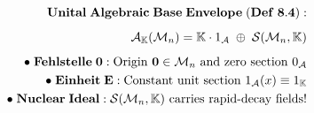\documentclass[preview]{standalone}
\begin{document}
\begin{align*}
\special{dvisvgm:raw <g id='unique000'>}\mathbf{Unital\;Algebraic\;Base\;Envelope\;(Def\;8.4):}\\[5pt]\mathcal{A}_{\mathbb{K}}(\mathcal{M}_n) = \mathbb{K}\cdot 1_{\mathcal{A}} \;\oplus\; \mathcal{S}(\mathcal{M}_n,\mathbb{K})\\[5pt]\bullet\;\mathbf{Fehlstelle\;0:}\;\text{Origin }\mathbf{0}\in\mathcal{M}_n\text{ and zero section }0_{\mathcal{A}}\\\bullet\;\mathbf{Einheit\;E:}\;\text{Constant unit section }1_{\mathcal{A}}(x)\equiv 1_{\mathbb{K}}\\\bullet\;\mathbf{Nuclear\;Ideal:}\;\mathcal{S}(\mathcal{M}_n,\mathbb{K})\text{ carries rapid-decay fields!}\special{dvisvgm:raw </g>}
\end{align*}
\end{document}
